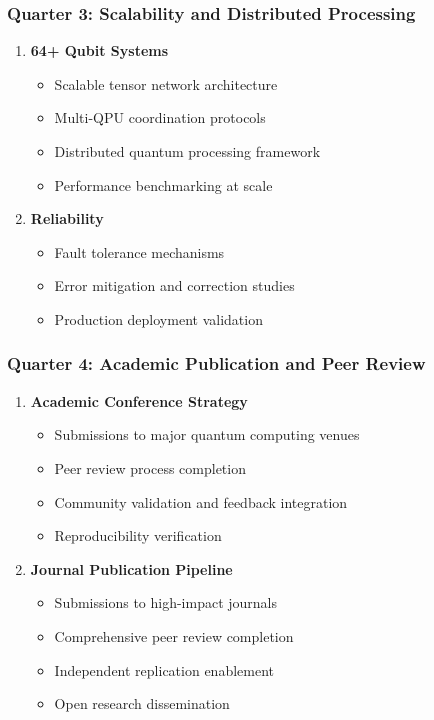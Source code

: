 \documentclass[12pt,a4paper]{article}
\begin{document}
\subsubsection{Quarter 3: Scalability and Distributed Processing}
\begin{enumerate}
    \item \textbf{64+ Qubit Systems}
    \begin{itemize}
        \item Scalable tensor network architecture
        \item Multi-QPU coordination protocols
        \item Distributed quantum processing framework
        \item Performance benchmarking at scale
    \end{itemize}
    
    \item \textbf{Reliability}
    \begin{itemize}
        \item Fault tolerance mechanisms
        \item Error mitigation and correction studies
        \item Production deployment validation
    \end{itemize}
\end{enumerate}

\subsubsection{Quarter 4: Academic Publication and Peer Review}
\begin{enumerate}
    \item \textbf{Academic Conference Strategy}
    \begin{itemize}
        \item Submissions to major quantum computing venues
        \item Peer review process completion
        \item Community validation and feedback integration
        \item Reproducibility verification
    \end{itemize}
    
    \item \textbf{Journal Publication Pipeline}
    \begin{itemize}
        \item Submissions to high-impact journals
        \item Comprehensive peer review completion
        \item Independent replication enablement
        \item Open research dissemination
    \end{itemize}
\end{enumerate}
\end{document}

